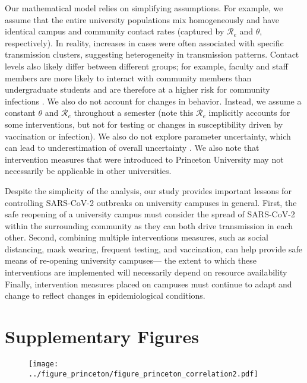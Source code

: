 \documentclass[12pt]{article}
\begin{document}
Our mathematical model relies on simplifying assumptions.
For example, we assume that the entire university populations mix homogeneously and have identical campus and community contact rates (captured by $\mathcal R_e$ and $\theta$, respectively).
In reality, increases in cases were often associated with specific transmission clusters, suggesting heterogeneity in transmission patterns.
Contact levels also likely differ between different groups;
for example, faculty and staff members are more likely to interact with community members than undergraduate students and are therefore at a higher risk for community infections \citep{frazier2022modeling}.
We also do not account for changes in behavior. 
Instead, we assume a constant $\theta$ and $\mathcal R_e$ throughout a semester (note this $\mathcal R_e$ implicitly accounts for some interventions, but not for testing or changes in susceptibility driven by vaccination or infection).
We also do not explore parameter uncertainty, which can lead to underestimation of overall uncertainty \citep{elderd2006uncertainty}. 
We also note that intervention measures that were introduced to Princeton University may not necessarily be applicable in other universities.

Despite the simplicity of the analysis, our study provides important lessons for controlling SARS-CoV-2 outbreaks on university campuses in general.
First, the safe reopening of a university campus must consider the spread of SARS-CoV-2 within the surrounding community as they can both drive transmission in each other.
Second, combining multiple interventions measures, such as social distancing, mask wearing, frequent testing, and vaccination, can help provide safe means of re-opening university campuses---
the extent to which these interventions are implemented will necessarily depend on resource availability
Finally, intervention measures placed on campuses must continue to adapt and change to reflect changes in epidemiological conditions.





\pagebreak

\section*{Supplementary Figures}

\begin{figure}[!th]
\texttt{[image: ../figure\_princeton/figure\_princeton\_correlation2.pdf]}
\end{figure}
\end{document}
